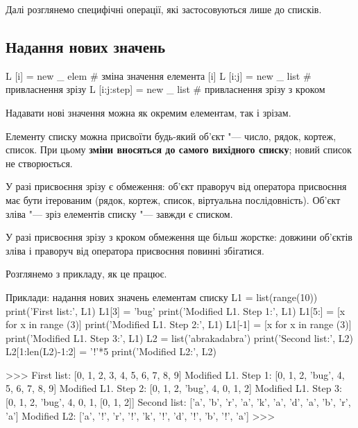 \medskip

Далі розглянемо специфічні операції, які застосовуються лише до списків.

\subsection{Надання нових значень}

\begin{pydef}
L [i] = new _ elem # зміна значення елемента [i]
L [i:j] = new _ list # привласнення зрізу
L [i:j:step] = new _ list # привласнення зрізу з кроком
\end{pydef}

Надавати нові значення можна як окремим елементам, так і зрізам.

Елементу списку  можна присвоїти будь-який об'єкт "--- число, рядок, кортеж, список. При цьому \textbf{зміни вносяться до самого вихідного списку}; новий список не створюється.

У разі присвоєння зрізу є обмеження: об'єкт праворуч від оператора присвоєння має бути ітерованим (рядок, кортеж, список, віртуальна послідовність). Об'єкт зліва "--- зріз елементів списку "--- завжди є списком.

У разі присвоєння зрізу з кроком обмеження ще більш жорстке: довжини об'єктів зліва і праворуч від оператора присвоєння повинні збігатися.

Розглянемо з прикладу, як це працює.

\begin{pyr}{}
\begin{py}{Приклади: надання нових значень елементам списку}
L1 = list(range(10))
print('First list:', L1)
L1[3] = 'bug'
print('Modified L1. Step 1:', L1)
L1[5:] = [x for x in range (3)]
print('Modified L1. Step 2:', L1)
L1[-1] = [x for x in range (3)]
print('Modified L1. Step 3:', L1)
L2 = list('abrakadabra')
print('Second list:', L2)
L2[1:len(L2)-1:2] = '!'*5
print('Modified L2:', L2)
\end{py}
\tcblower
\begin{py}{}
>>>
First list: [0, 1, 2, 3, 4, 5, 6, 7, 8, 9]
Modified L1. Step 1: [0, 1, 2, 'bug', 4, 5, 6, 7, 8, 9]
Modified L1. Step 2: [0, 1, 2, 'bug', 4, 0, 1, 2]
Modified L1. Step 3: [0, 1, 2, 'bug', 4, 0, 1, [0, 1, 2]]
Second list: ['a', 'b', 'r', 'a', 'k', 'a', 'd', 'a', 'b', 'r', 'a']
Modified L2: ['a', '!', 'r', '!', 'k', '!', 'd', '!', 'b', '!', 'a']
>>>
\end{py}
\end{pyr}

